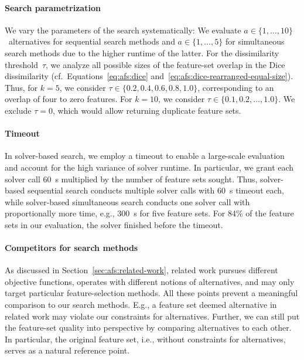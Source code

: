 \documentclass{article}
\theoremstyle{definition}
\begin{document}
\paragraph{Search parametrization}

We vary the parameters of the search systematically:
We evaluate $a \in \{1, \dots, 10\}$~alternatives for sequential search methods and $a \in \{1, \dots, 5\}$ for simultaneous search methods due to the higher runtime of the latter.
For the dissimilarity threshold~$\tau$, we analyze all possible sizes of the feature-set overlap in the Dice dissimilarity (cf.~Equations~\ref{eq:afs:dice} and~\ref{eq:afs:dice-rearranged-equal-size}).
Thus, for $k=5$, we consider $\tau \in \{0.2, 0.4, 0.6, 0.8, 1.0\}$, corresponding to an overlap of four to zero features.
For $k=10$, we consider $\tau \in \{0.1, 0.2, \dots, 1.0\}$.
We exclude $\tau = 0$, which would allow returning duplicate feature sets.

\paragraph{Timeout}

In solver-based search, we employ a timeout to enable a large-scale evaluation and account for the high variance of solver runtime.
In particular, we grant each solver call 60~s multiplied by the number of feature sets sought.
Thus, solver-based sequential search conducts multiple solver calls with 60~s timeout each, while solver-based simultaneous search conducts one solver call with proportionally more time, e.g., 300~s for five feature sets.
For 84\% of the feature sets in our evaluation, the solver finished before the timeout.

\paragraph{Competitors for search methods}

As discussed in Section~\ref{sec:afs:related-work}, related work pursues different objective functions, operates with different notions of alternatives, and may only target particular feature-selection methods.
All these points prevent a meaningful comparison to our search methods.
E.g., a feature set deemed alternative in related work may violate our constraints for alternatives.
Further, we can still put the feature-set quality into perspective by comparing alternatives to each other.
In particular, the original feature set, i.e., without constraints for alternatives, serves as a natural reference point.
\end{document}
